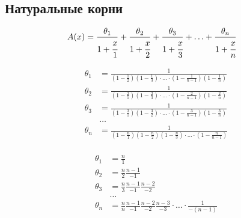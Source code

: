 
\subsection{Натуральные корни}

\begin{equation*} \begin{aligned}
&A(x) =
  \frac{\theta_1}{1 + \cfrac{x}{1}}
+ \frac{\theta_2}{1 + \cfrac{x}{2}}
+ \frac{\theta_3}{1 + \cfrac{x}{3}}
+ \ldots
+ \frac{\theta_n}{1 + \cfrac{x}{n}}
\end{aligned} \end{equation*}

\begin{equation*} \begin{aligned}
\theta_1 &= \frac{1}{
  \left(1 - \displaystyle \frac{1}{2} \right)
  \left(1 - \displaystyle \frac{1}{3} \right)
  \cdot \ldots \cdot
  \left(1 - \displaystyle \frac{1}{{n - 1}} \right)
  \left(1 - \displaystyle \frac{1}{n} \right)} \\
\theta_2 &= \frac{1}{
  \left(1 - \displaystyle \frac{2}{1} \right)
  \left(1 - \displaystyle \frac{2}{3} \right)
  \cdot \ldots \cdot
  \left(1 - \displaystyle \frac{2}{{n - 1}} \right)
  \left(1 - \displaystyle \frac{2}{n} \right)} \\
\theta_3 &= \frac{1}{
  \left(1 - \displaystyle \frac{3}{1} \right)
  \left(1 - \displaystyle \frac{3}{2} \right)
  \cdot \ldots \cdot
  \left(1 - \displaystyle \frac{3}{{n - 1}} \right)
  \left(1 - \displaystyle \frac{3}{n} \right)} \\
&\ldots \\
\theta_n &= \frac{1}{
  \left(1 - \displaystyle \frac{n}{1} \right)
  \left(1 - \displaystyle \frac{n}{2} \right)
  \left(1 - \displaystyle \frac{n}{3} \right)
  \cdot \ldots \cdot
  \left(1 - \displaystyle \frac{n}{{n - 1}} \right)} \\
\end{aligned} \end{equation*}

\begin{equation*} \begin{aligned}
\theta_1 &=
  \displaystyle \frac{n}{1} \\
\theta_2 &=
  \displaystyle \frac{n}{2}
  \displaystyle \frac{n - 1}{-1} \\
\theta_3 &=
  \displaystyle \frac{n}{3}
  \displaystyle \frac{n - 1}{-1}
  \displaystyle \frac{n - 2}{-2} \\
&\ldots \\
\theta_n &=
  \displaystyle \frac{n}{n}
  \displaystyle \frac{n - 1}{-1}
  \displaystyle \frac{n - 2}{-2}
  \displaystyle \frac{n - 3}{-3}
  \cdot \ldots \cdot
  \displaystyle \frac{1}{-(n - 1)}
  \\
\end{aligned} \end{equation*}


